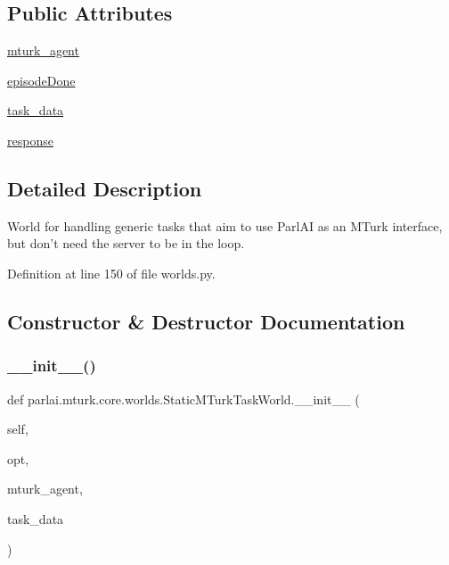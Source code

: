 \subsection*{Public Attributes}
\begin{DoxyCompactItemize}
\item 
\hyperlink{classparlai_1_1mturk_1_1core_1_1worlds_1_1StaticMTurkTaskWorld_a25d8cc71893b0b67169cba15f142b1bc}{mturk\+\_\+agent}
\item 
\hyperlink{classparlai_1_1mturk_1_1core_1_1worlds_1_1StaticMTurkTaskWorld_a2f913dd10cf988cb7e67cdc9efaa6802}{episode\+Done}
\item 
\hyperlink{classparlai_1_1mturk_1_1core_1_1worlds_1_1StaticMTurkTaskWorld_ad8f9036d50f5787b4872609a17c267e0}{task\+\_\+data}
\item 
\hyperlink{classparlai_1_1mturk_1_1core_1_1worlds_1_1StaticMTurkTaskWorld_af05fea586c5e73130cb159f6486c1855}{response}
\end{DoxyCompactItemize}


\subsection{Detailed Description}
\begin{DoxyVerb}World for handling generic tasks that aim to use ParlAI as an MTurk interface, but
don't need the server to be in the loop.
\end{DoxyVerb}
 

Definition at line 150 of file worlds.\+py.



\subsection{Constructor \& Destructor Documentation}
\mbox{\label{classparlai_1_1mturk_1_1core_1_1worlds_1_1StaticMTurkTaskWorld_a6bf4b23fee7509456b074b9587043d17}} 
\subsubsection{\texorpdfstring{\+\_\+\+\_\+init\+\_\+\+\_\+()}{\_\_init\_\_()}}
{\footnotesize\ttfamily def parlai.\+mturk.\+core.\+worlds.\+Static\+M\+Turk\+Task\+World.\+\_\+\+\_\+init\+\_\+\+\_\+ (\begin{DoxyParamCaption}\item[{}]{self,  }\item[{}]{opt,  }\item[{}]{mturk\+\_\+agent,  }\item[{}]{task\+\_\+data }\end{DoxyParamCaption})}

